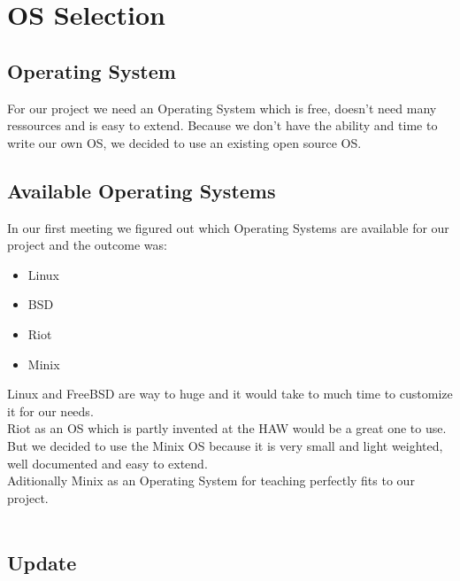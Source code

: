 
\chapter{OS Selection}

\section{Operating System}

For our project we need an Operating System which is free, doesn't need many ressources and is easy to extend. Because we don't have the ability and time to write our own OS, we decided to use an existing open source OS. 

\section{Available Operating Systems}

In our first meeting we figured out which Operating Systems are available for our project and the outcome was:
\begin{itemize}
	\item Linux
	\item BSD
	\item Riot
	\item Minix 
\end{itemize}
Linux and FreeBSD are way to huge and it would take to much time to customize it for our needs.\\
Riot as an OS which is partly invented at the HAW would be a great one to use.\\
But we decided to use the Minix OS because it is very small and light weighted, well documented and easy to extend.\\
Aditionally Minix as an Operating System for teaching perfectly fits to our project.\\
\\
\section{Update}

